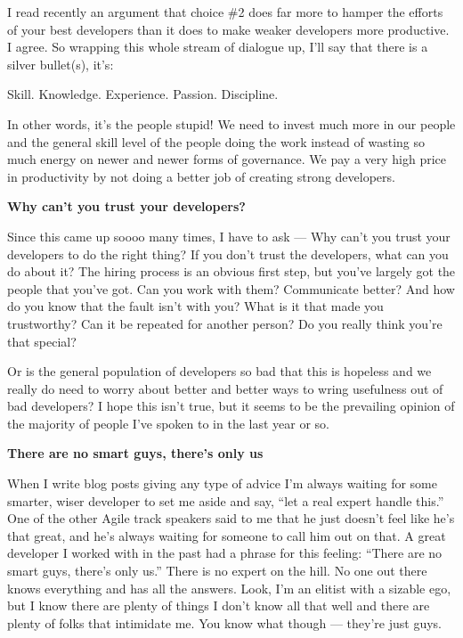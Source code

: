 \documentclass{article}
\begin{document}
{I read recently an argument that choice \#2 does far more to hamper the efforts of your best developers than it does to make weaker developers more productive.  I agree.  So wrapping this whole stream of dialogue up, I'll say that there is a silver bullet(s), it's:

Skill.  Knowledge.  Experience.  Passion.  Discipline.

In other words, it's the people stupid!  We need to invest much more in our people and the general skill level of the people doing the work instead of wasting so much energy on newer and newer forms of governance.  We pay a very high price in productivity by not doing a better job of creating strong developers.

 
\Large {\textbf {Why can't you trust your developers?}}

Since this came up soooo many times, I have to ask — Why can't you trust your developers to do the right thing?  If you don't trust the developers, what can you do about it?  The hiring process is an obvious first step, but you've largely got the people that you've got.  Can you work with them?  Communicate better?  And how do you know that the fault isn't with you?  What is it that made you trustworthy?  Can it be repeated for another person?  Do you really think you're that special?

Or is the general population of developers so bad that this is hopeless and we really do need to worry about better and better ways to wring usefulness out of bad developers?  I hope this isn't true, but it seems to be the prevailing opinion of the majority of people I've spoken to in the last year or so.

 
\Large {\textbf {There are no smart guys, there's only us}}

When I write blog posts giving any type of advice I'm always waiting for some smarter, wiser developer to set me aside and say, “let a real expert handle this.”  One of the other Agile track speakers said to me that he just doesn't feel like he's that great, and he's always waiting for someone to call him out on that.  A great developer I worked with in the past had a phrase for this feeling:  “There are no smart guys, there's only us.”  There is no expert on the hill.  No one out there knows everything and has all the answers.  Look, I'm an elitist with a sizable ego, but I know there are plenty of things I don't know all that well and there are plenty of folks that intimidate me.  You know what though — they're just guys. 

}
\end{document}
